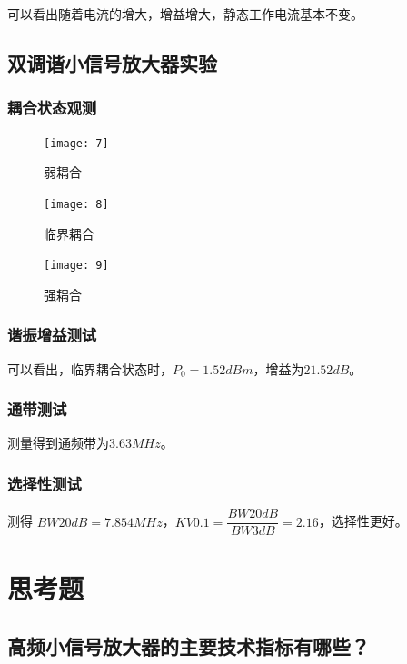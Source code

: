 \documentclass{../source/Experiment}
\begin{document}
可以看出随着电流的增大，增益增大，静态工作电流基本不变。

\subsection{双调谐小信号放大器实验}

\subsubsection{耦合状态观测}

\begin{figure}[H]
    \centering
    \texttt{[image: 7]}
    \caption{弱耦合}
\end{figure}

\begin{figure}[H]
    \centering
    \texttt{[image: 8]}
    \caption{临界耦合}
\end{figure}

\begin{figure}[H]
    \centering
    \texttt{[image: 9]}
    \caption{强耦合}
\end{figure}

\subsubsection{谐振增益测试}

可以看出，临界耦合状态时，$P_0 = 1.52dBm$，增益为$21.52dB$。

\subsubsection{通带测试}

测量得到通频带为$3.63MHz$。

\subsubsection{选择性测试}

测得 $BW20dB = 7.854MHz$，$ KV 0.1 =\dfrac{BW20dB}{BW3dB}=2.16$，选择性更好。


\section{思考题}
\subsection{高频小信号放大器的主要技术指标有哪些？}
\end{document}
